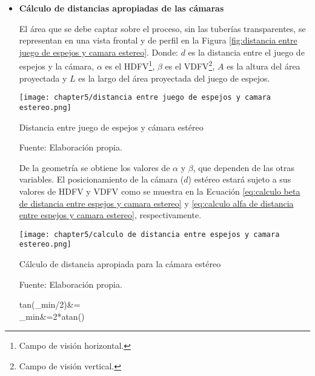 \begin{itemize}
	
	\item \textbf{Cálculo de distancias apropiadas de las cámaras}
	
	El área que se debe captar sobre el proceso, sin las tuberías transparentes, se representan  en una vista frontal y de perfil en la Figura \ref{fig:distancia entre juego de espejos y camara estereo}. Donde: $d$ es la distancia entre el juego de espejos y la cámara, $\alpha$ es el HDFV\footnote{Campo de visión horizontal.}, $\beta$ es el VDFV\footnote{Campo de visión vertical.}, $A$ es la altura del área proyectada y $L$ es la largo del área proyectada del juego de espejos.
	
	\begin{myfigure}[H]
		\centering
		\texttt{[image: chapter5/distancia entre juego de espejos y camara estereo.png]}
		\caption{Distancia entre juego de espejos y cámara estéreo}
		\begin{myflushleftportland}
			Fuente: Elaboración propia.
		\end{myflushleftportland}
		\label{fig:distancia entre juego de espejos y camara estereo}
	\end{myfigure}

	De la geometría se obtiene los valores de $\alpha$ y $\beta$, que dependen de las otras variables. El posicionamiento de la cámara ($d$) estéreo estará sujeto a sus valores de HDFV y VDFV como se muestra en la Ecuación \ref{eq:calculo beta de distancia entre espejos y camara estereo} y \ref{eq:calculo alfa de distancia entre espejos y camara estereo}, respectivamente.
		
	\begin{myfigure}[H]
		\centering
		\texttt{[image: chapter5/calculo de distancia entre espejos y camara estereo.png]}
		\caption{Cálculo de distancia apropiada para la cámara estéreo}
		\begin{myflushleftportland}
			Fuente: Elaboración propia.
		\end{myflushleftportland}
		\label{fig:calculo de distancia entre espejos y camara estereo}
	\end{myfigure}
	
	\begin{myequation}\label{eq:calculo alfa de distancia entre espejos y camara estereo}
		\begin{split}
			tan(\alpha_{min}/2)&=\\
			\alpha_{min}&=2*atan()\\
		\end{split}		
	\end{myequation}


\end{itemize}
